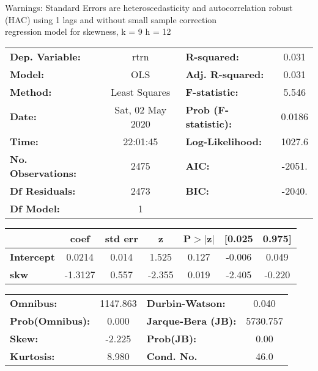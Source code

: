Warnings: \newline
 [1] Standard Errors are heteroscedasticity and autocorrelation robust (HAC) using 1 lags and without small sample correction\\ 

regression model for skewness, k = 9 h = 12\begin{center}
\begin{tabular}{lclc}
\toprule
\textbf{Dep. Variable:}    &       rtrn       & \textbf{  R-squared:         } &     0.031   \\
\textbf{Model:}            &       OLS        & \textbf{  Adj. R-squared:    } &     0.031   \\
\textbf{Method:}           &  Least Squares   & \textbf{  F-statistic:       } &     5.546   \\
\textbf{Date:}             & Sat, 02 May 2020 & \textbf{  Prob (F-statistic):} &   0.0186    \\
\textbf{Time:}             &     22:01:45     & \textbf{  Log-Likelihood:    } &    1027.6   \\
\textbf{No. Observations:} &        2475      & \textbf{  AIC:               } &    -2051.   \\
\textbf{Df Residuals:}     &        2473      & \textbf{  BIC:               } &    -2040.   \\
\textbf{Df Model:}         &           1      & \textbf{                     } &             \\
\bottomrule
\end{tabular}
\begin{tabular}{lcccccc}
                   & \textbf{coef} & \textbf{std err} & \textbf{z} & \textbf{P$> |$z$|$} & \textbf{[0.025} & \textbf{0.975]}  \\
\midrule
\textbf{Intercept} &       0.0214  &        0.014     &     1.525  &         0.127        &       -0.006    &        0.049     \\
\textbf{skw}       &      -1.3127  &        0.557     &    -2.355  &         0.019        &       -2.405    &       -0.220     \\
\bottomrule
\end{tabular}
\begin{tabular}{lclc}
\textbf{Omnibus:}       & 1147.863 & \textbf{  Durbin-Watson:     } &    0.040  \\
\textbf{Prob(Omnibus):} &   0.000  & \textbf{  Jarque-Bera (JB):  } & 5730.757  \\
\textbf{Skew:}          &  -2.225  & \textbf{  Prob(JB):          } &     0.00  \\
\textbf{Kurtosis:}      &   8.980  & \textbf{  Cond. No.          } &     46.0  \\
\bottomrule
\end{tabular}
\end{center}

